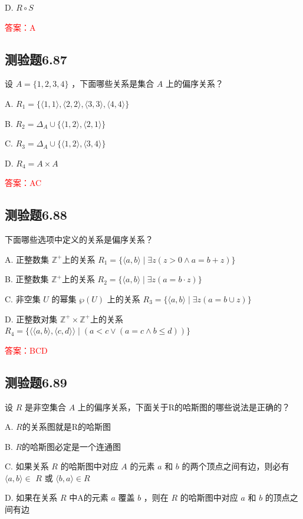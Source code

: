 \documentclass[UTF8, heading=true]{ctexart}
\begin{document}
D. $R \circ S$

\textcolor{red}{答案：A}


\subsection{测验题6.87}

设 $A=\{1,2,3,4\}$ ，下面哪些关系是集合 $A$ 上的偏序关系？


A. $
R_1=\{\langle 1,1\rangle,\langle 2,2\rangle,\langle 3,3\rangle,\langle 4,4\rangle\}
$

B. $R_2=\Delta_A \cup\{\langle 1,2\rangle,\langle 2,1\rangle\}$

C. $R_3=\Delta_A \cup\{\langle 1,2\rangle,\langle 3,4\rangle\}$

D. $R_4=A \times A$

\textcolor{red}{答案：AC}

\subsection{测验题6.88}

下面哪些选项中定义的关系是偏序关系？

A. 正整数集 $\mathbb{Z}^{+}$上的关系 $R_1=\{\langle a, b\rangle \mid \exists z(z>0 \wedge a=b+z)\}$

B. 正整数集 $\mathbb{Z}^{+}$上的关系 $R_2=\{\langle a, b\rangle \mid \exists z(a=b \cdot z)\}$

C. 非空集 $U$ 的幂集 $\wp(U)$ 上的关系 $R_3=\{\langle a, b\rangle \mid \exists z(a=b \cup z)\}$

D. 正整数对集 $\mathbb{Z}^{+} \times \mathbb{Z}^{+}$上的关系 $R_4=\{\langle\langle a, b\rangle,\langle c, d\rangle\rangle \mid(a<c \vee(a=c \wedge b \leq d))\}$


\textcolor{red}{答案：BCD}

\subsection{测验题6.89}

设 $R$ 是非空集合 $A$ 上的偏序关系，下面关于R的哈斯图的哪些说法是正确的？

A. $R$的关系图就是R的哈斯图

B. $R$的哈斯图必定是一个连通图

C. 如果关系 $R$ 的哈斯图中对应 $A$ 的元素 $a$ 和 $b$ 的两个顶点之间有边，则必有 $\langle a, b\rangle \in$ $R$ 或 $\langle b, a\rangle \in R$

D. 如果在关系 $R$ 中A的元素 $a$ 覆盖 $b$ ，则在 $R$ 的哈斯图中对应 $a$ 和 $b$ 的顶点之间有边
\end{document}

